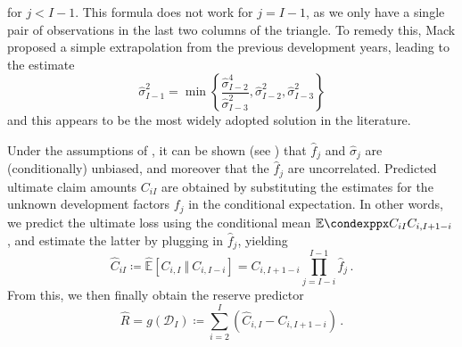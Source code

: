 \documentclass[a4paper]{book}
\begin{document}
for $j < I - 1$. This formula does not work for $j = I - 1$, as we only have a single pair of observations in the last two columns of the triangle. To remedy this, Mack proposed a simple extrapolation from the previous development years, leading to the estimate
\begin{equation}
  \widehat{\sigma}^2_{I - 1} = \min{ \left \{ \frac{\widehat{\sigma}^4_{I - 2}}{\widehat{\sigma}^2_{I - 3}}, \widehat{\sigma}^2_{I - 2}, \widehat{\sigma}^2_{I - 3} \right \} }
\end{equation}
and this appears to be the most widely adopted solution in the literature.

Under the assumptions of , it can be shown (see \cite[17 \psqq]{wuthrich:stochastic-reserving}) that $\widehat{f}_j$ and $\widehat{\sigma}_j$ are (conditionally) unbiased, and moreover that the $\widehat{f}_j$ are uncorrelated. Predicted ultimate claim amounts $C_{iI}$ are obtained by substituting the estimates for the unknown development factors $f_j$ in the conditional expectation. In other words, we predict the ultimate loss using the conditional mean $\condexpp{C_{iI}}{C_{i, I + 1 - i}}$, and estimate the latter by plugging in $\widehat{f}_j$, yielding
\begin{equation}
  \widehat{C}_{iI} \coloneqq \widehat{\mathbb{E}}[C_{i, I} \ \Vert \ C_{i, I - i}] = C_{i, I + 1 - i} \prod_{j = I - i}^{I-1} \widehat{f}_j \,.
\end{equation}
From this, we then finally obtain the reserve predictor
\begin{equation} \label{eq:reserve-predictor}
  \widehat{R} = g(\mathcal{D}_I) \coloneqq \sum_{i = 2}^I (\widehat{C}_{i, I} - C_{i, I + 1- i}) \,.
\end{equation}
\end{document}
